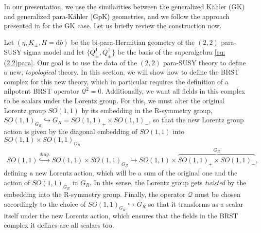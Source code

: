 \documentclass[letterpaper,12pt]{article}
\newcommand{\QQ}{\mathcal{Q}}
\newcommand{\rd}{\mathrm{d}}
\theoremstyle{definition}
\theoremstyle{remark}
\theoremstyle{examples}
\begin{document}
In our presentation, we use the similarities between the generalized K\"{a}hler (GK) and generalized para-K\"{a}hler (GpK) geometries, and we follow the approach presented in \cite{Kapustin:2004gv} for the GK case. Let us briefly review the construction now.

Let $(\eta,K_\pm,H=\rd b)$ be the bi-para-Hermitian geometry of the $(2,2)$ para-SUSY sigma model and let $\{Q^1_\pm,Q^1_\pm\}$ be the basis of the superalgebra \eqref{eq:(2,2)para}. Our goal is to use the data of the $(2,2)$ para-SUSY theory to define a new, {\it topological} theory. In this section, we will show how to define the BRST complex for this new theory, which in particular requires the definition of a nilpotent BRST operator $\QQ^2=0$. Additionally, we want all fields in this complex to be scalars under the Lorentz group. For this, we must alter the original Lorentz group $SO(1,1)$ by its embedding in the R-symmetry group, $SO(1,1)_{G_R}\hookrightarrow G_R=SO(1,1)_+\times SO(1,1)_-$, so that the new Lorentz group action is given by the diagonal embedding of $SO(1,1)$ into $SO(1,1)\times SO(1,1)_{G_R}$
\begin{align}\label{embeddings}
SO(1,1)\overset{diag.}{\hookrightarrow} SO(1,1)\!\times\! SO(1,1)_{G_R}\!\!\hookrightarrow SO(1,1)\!\times\! \overbrace{SO(1,1)_+\!\times\! SO(1,1)_-}^{G_R},
\end{align}
defining a new Lorentz action, which will be a sum of the original one and the action of $SO(1,1)_{G_R}$ in $G_R$. In this sense, the Lorentz group gets {\it twisted} by the embedding into the R-symmetry group. Finally, the operator $\QQ$ must be chosen accordingly to the choice of $SO(1,1)_{G_R}\hookrightarrow G_R$ so that it transforms as a scalar itself under the new Lorentz action, which ensures that the fields in the BRST complex it defines are all scalars too.
\end{document}
